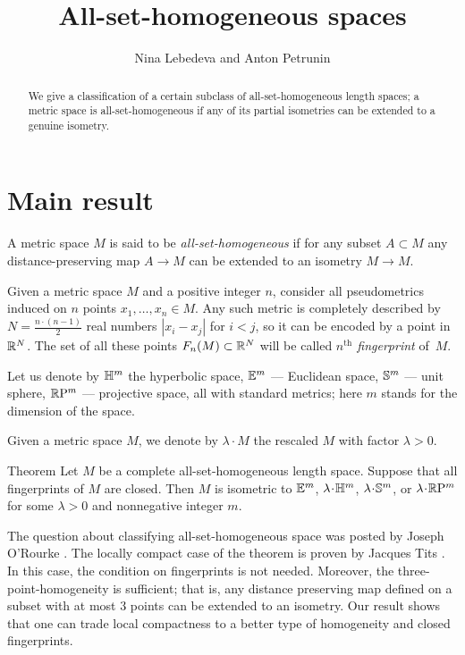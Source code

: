 \documentclass[a4paper,10pt]{article}
\def\thetitle{All-set-homogeneous spaces}
\def\theauthors{Nina Lebedeva and Anton Petrunin}
\begin{document}


\title{\thetitle}
\author{\theauthors}
\date{}
\maketitle

\begin{abstract}
We give a classification of a certain subclass of all-set-homogeneous length spaces;
a metric space is all-set-homogeneous if any of its partial isometries can be extended to a genuine isometry.
\end{abstract}

\section{Main result}

A metric space $M$ is said to be \emph{all-set-homogeneous} if for any subset $A\subset M$ any distance-preserving map $A\to M$ can be extended to an isometry $M\to M$.

Given a metric space $M$ and a positive integer $n$, consider all pseudometrics induced on $n$ points $x_1,\dots, x_n\in M$.
Any such metric is completely described by $N=\tfrac{n\cdot (n-1)}2$ real numbers $|x_i-x_j|$ for $i<j$, so it can be encoded by a point in $\RR^N$.
The set of all these points $F_n(M)\subset \RR^N$ will be called \emph{$n^\text{th}$ fingerprint} of~$M$.

Let us denote by $\HH^m$ the hyperbolic space,
$\EE^m$ --- Euclidean space, $\S^m$ --- unit sphere, $\RP^m$ --- projective space, all with standard metrics;
here $m$ stands for the dimension of the space.

Given a metric space $M$, we denote by $\lambda\cdot M$ the rescaled $M$ with factor $\lambda>0$.

\begin{thm}{Theorem}\label{all-sets}
Let $M$ be a complete all-set-homogeneous length space.
Suppose that all fingerprints of $M$ are closed.
Then $M$ is isometric to $\EE^m$, $\lambda\cdot \HH^m$, $\lambda\cdot\S^m$, or $\lambda\cdot\RP^m$ for some $\lambda>0$ and nonnegative integer $m$.
\end{thm}

The question about classifying all-set-homogeneous space was posted by Joseph O'Rourke \cite{rourke}.
The locally compact case of the theorem is proven by Jacques Tits \cite{tits}.
In this case, the condition on fingerprints is not needed.
Moreover, the three-point-homogeneity is sufficient; that is, any distance preserving map defined on a subset with at most 3 points can be extended to an isometry.
Our result shows that one can trade local compactness to a better type of homogeneity and closed fingerprints.
\end{document}
